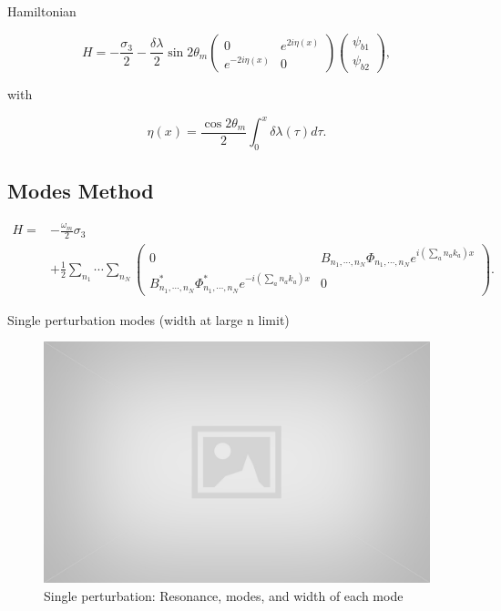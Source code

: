 \documentclass[%
preprint,
 amsmath,amssymb,
 aps,
]{revtex4-1}
\begin{document}
Hamiltonian

\begin{equation}
 H = -\frac{\sigma_3}{2} - \frac{\delta \lambda}{2} \sin 2\theta_m \begin{pmatrix} 0 & e^{2i\eta(x)} \\ e^{-2 i\eta(x) } & 0 \end{pmatrix}  \begin{pmatrix} \psi_{b1} \\ \psi_{b2} \end{pmatrix},
\end{equation}

with

\begin{equation}
 \eta(x) =  \frac{\cos 2\theta_m}{2} \int_0^x \delta\lambda (\tau) d\tau.
\end{equation}




\subsection{Modes Method}

\begin{align}
H =& -\frac{\omega_m}{2} \sigma_3 \nonumber \\
&+ \frac{1}{2} \sum_{n_1} \cdots \sum_{n_N} \begin{pmatrix} 0 & B_{n_1,\cdots,n_N} \Phi_{n_1,\cdots, n_N} e^{i \left( \sum_{a} n_a k_a   \right)x} \\ B_{n_1,\cdots,n_N}^* \Phi_{n_1,\cdots, n_N}^* e^{-i \left( \sum_{a} n_a k_a   \right)x} & 0 \end{pmatrix}.
\end{align}


Single perturbation modes (width at large n limit)

\begin{figure}
    \centering
    \includegraphics[width=\textwidth]{assets/placeholder.jpg}
    \caption{Single perturbation: Resonance, modes, and width of each mode}
    \label{fig:single-perturbation}
\end{figure}
\end{document}
